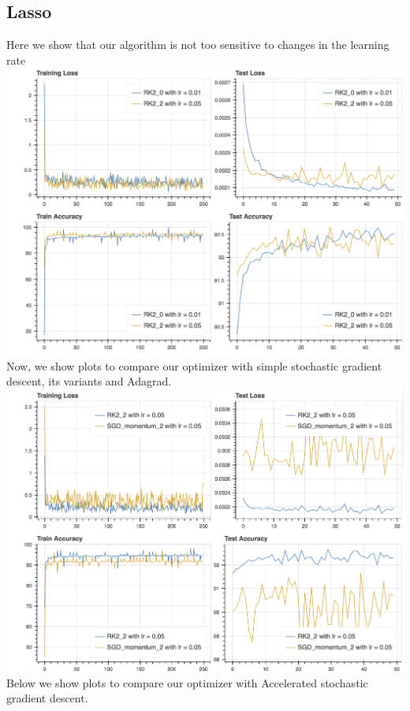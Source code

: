\subsection*{Lasso}
Here we show that our algorithm is not too sensitive to changes in the learning rate
\\
\includegraphics[scale=0.4]{plots/plots_1/lasso_4.png}
\\
Now, we show plots to compare our optimizer with simple stochastic gradient descent, its variants and Adagrad.
\\
\includegraphics[scale=0.4]{plots/plots_1/lasso_3.png}
\\
Below we show plots to compare our optimizer with Accelerated stochastic gradient descent.
\\
